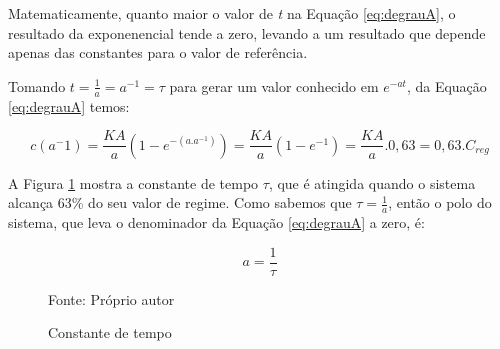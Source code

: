 






Matematicamente, quanto maior o valor de \emph{t} na Equação \ref{eq:degrauA}, o resultado da exponenencial tende a zero, levando a um resultado que depende apenas das constantes para o valor de referência. 

Tomando $t= \frac{1}{a} = a^{-1} = \tau$ para gerar um valor conhecido em $e^{-at}$, da Equação \ref{eq:degrauA} temos:


\begin{equation}
c(a^-1) = \frac{KA}{a}(1-e^{-(a.a^{-1})}) = \frac{KA}{a}(1-e^{-1}) = \frac{KA}{a}.0,63 = 0,63 . C_{reg}
\end{equation}

A Figura \ref{fig:constTempo} mostra a constante de tempo $\tau$, que é atingida quando o sistema alcança 63\% do seu valor de regime. Como sabemos que $\tau = \frac{1}{a}$, então o polo do sistema, que leva o denominador da Equação \ref{eq:degrauA} a zero, é:

\begin{equation}
a = \frac{1}{\tau}
\end{equation}



\begin{figure}
\centering
\caption{Constante de tempo}
\label{fig:constTempo}

{\small Fonte: Próprio autor}
\end{figure}

